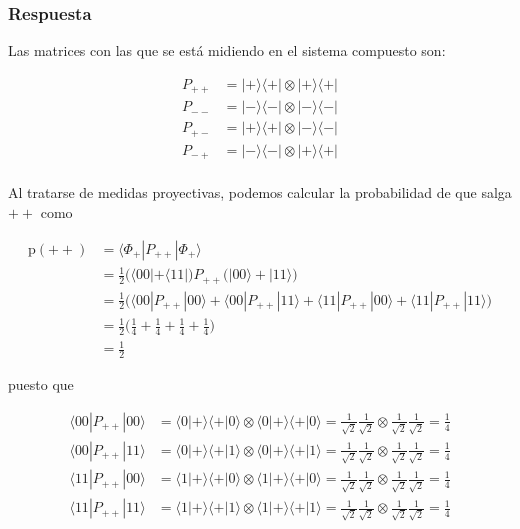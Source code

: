 \documentclass{article}
\begin{document}
\subsubsection*{Respuesta}

Las matrices con las que se está midiendo en el sistema
compuesto son:

\begin{align*}
  P_{++} &= |+\rangle\langle+| \otimes |+\rangle\langle+| \\
  P_{--} &= |-\rangle\langle-| \otimes |-\rangle\langle-| \\
  P_{+-} &= |+\rangle\langle+| \otimes |-\rangle\langle-| \\
  P_{-+} &= |-\rangle\langle-| \otimes |+\rangle\langle+| \\
\end{align*}

Al tratarse de medidas proyectivas, podemos calcular la 
probabilidad de que salga $++$ como 

\begin{align*}
  \text{p}(++) &= \langle \Phi_+ | P_{++} |\Phi_+ \rangle \\ 
    &= \frac{1}{2}
        \Big( \langle 00| + \langle 11| \Big)
        P_{++}
        \Big(|00\rangle + |11\rangle\Big) \\
    &= \frac{1}{2}\Big(  
      \langle 00|P_{++}|00\rangle + \langle 00|P_{++}|11\rangle +
      \langle 11|P_{++}|00\rangle + \langle 11|P_{++}|11\rangle
    \Big) \\
    &= \frac{1}{2}\Big(
      \frac{1}{4} + \frac{1}{4} + \frac{1}{4} + \frac{1}{4}
    \Big) \\ 
    &= \frac{1}{2}
\end{align*}

puesto que 

\begin{align*}
  \langle 00|P_{++}|00\rangle 
    &= \langle 0|+\rangle\langle +|0\rangle
      \otimes \langle 0|+\rangle\langle +|0\rangle
    = \frac{1}{\sqrt{2}}\frac{1}{\sqrt{2}}
      \otimes \frac{1}{\sqrt{2}}\frac{1}{\sqrt{2}}
    = \frac{1}{4} \\
  \langle 00|P_{++}|11\rangle 
    &= \langle 0|+\rangle\langle +|1\rangle
      \otimes \langle 0|+\rangle\langle +|1\rangle
    = \frac{1}{\sqrt{2}}\frac{1}{\sqrt{2}}
      \otimes \frac{1}{\sqrt{2}}\frac{1}{\sqrt{2}}
    = \frac{1}{4} \\
  \langle 11|P_{++}|00\rangle 
    &= \langle 1|+\rangle\langle +|0\rangle
      \otimes \langle 1|+\rangle\langle +|0\rangle
    = \frac{1}{\sqrt{2}}\frac{1}{\sqrt{2}}
      \otimes \frac{1}{\sqrt{2}}\frac{1}{\sqrt{2}}
    = \frac{1}{4} \\
  \langle 11|P_{++}|11\rangle 
    &= \langle 1|+\rangle\langle +|1\rangle
      \otimes \langle 1|+\rangle\langle +|1\rangle
    = \frac{1}{\sqrt{2}}\frac{1}{\sqrt{2}}
      \otimes \frac{1}{\sqrt{2}}\frac{1}{\sqrt{2}}
    = \frac{1}{4} \\
\end{align*}
\end{document}
